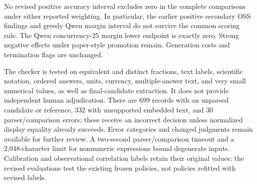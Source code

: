 \begin{table}[htbp]
\centering\small
\caption{Selected changes after applying the same revised scoring rule to both conditions. Changes and 95\% intervals are percentage points. Attempt weighting is primary; problem weighting is secondary. Historical values are retained here only to document the audit and are not mixed into current result tables.}
\label{tab:guiding-rescoring-audit}
\end{table}

No revised positive accuracy interval excludes zero in the complete
comparisons under either reported weighting. In particular, the earlier
positive secondary OSS findings and greedy Qwen margin interval do not
survive the common scoring rule. The Qwen concurrency-25 margin lower
endpoint is exactly zero. Strong negative effects under paper-style
promotion remain. Generation costs and termination flags are unchanged.

The checker is tested on equivalent and distinct fractions, text labels,
scientific notation, ordered answers, units, currency, multiple-answer text,
and very small numerical values, as well as final-candidate extraction.
It does not provide independent human adjudication. There are 699 records
with an unparsed candidate or reference, 332 with unsupported embedded
text, and 30 parser/comparison errors; these receive an incorrect decision
unless normalized display equality already succeeds. Error categories
and changed judgments remain available for further review. A two-second
parser/comparison timeout and a 2,048-character limit for nonnumeric
expressions bound degenerate inputs. Calibration and observational
correlation labels retain their original values: the revised evaluations
test the existing frozen policies, not policies refitted with revised labels.
